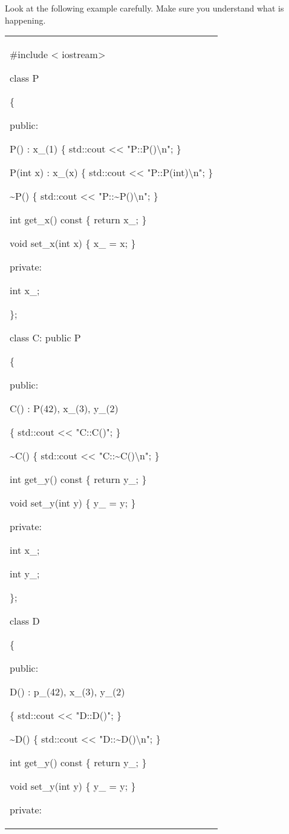 \documentclass[
]{article}
\begin{document}
Look at the following example carefully. Make sure you understand what
is happening.

\begin{longtable}[]{@{}
  >{\raggedright\arraybackslash}p{}@{}}
\toprule\noalign{}
 \\
\midrule\noalign{}
\endhead
\bottomrule\noalign{}
\endlastfoot
\#include < iostream\textgreater{}

class P

\{

public:

P() : x\_(1) \{ std::cout <<{} "P::P()\textbackslash n";
\}

P(int x) : x\_(x) \{ std::cout <<{}
"P::P(int)\textbackslash n"; \}

\textasciitilde P() \{ std::cout <<{}
"P::\textasciitilde P()\textbackslash n"; \}

int get\_x() const \{ return x\_; \}

void set\_x(int x) \{ x\_ = x; \}

private:

int x\_;

\};

class C: public P

\{

public:

C() : P(42), x\_(3), y\_(2)

\{ std::cout <<{} "C::C()"; \}

\textasciitilde C() \{ std::cout <<{}
"C::\textasciitilde C()\textbackslash n"; \}

int get\_y() const \{ return y\_; \}

void set\_y(int y) \{ y\_ = y; \}

private:

int x\_;

int y\_;

\};

class D

\{

public:

D() : p\_(42), x\_(3), y\_(2)

\{ std::cout <<{} "D::D()"; \}

\textasciitilde D() \{ std::cout <<{}
"D::\textasciitilde D()\textbackslash n"; \}

int get\_y() const \{ return y\_; \}

void set\_y(int y) \{ y\_ = y; \}

private:


\end{longtable}
\end{document}
